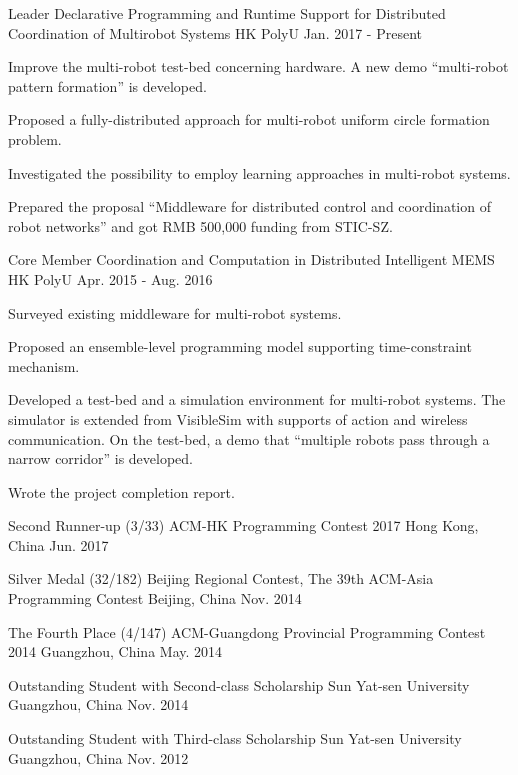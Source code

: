\documentclass[11pt, a4paper]{awesome-cv} %
\begin{document}
\begin{cventries}
\cventry
{Leader} %
{Declarative Programming and Runtime Support for Distributed Coordination of Multirobot Systems} %
{HK PolyU} %
{Jan. 2017 - Present} %
{ %
\begin{cvitems}
\item {Improve the multi-robot test-bed concerning hardware. A new demo ``multi-robot pattern formation'' is developed.}
\item {Proposed a fully-distributed approach for multi-robot uniform circle formation problem.}
\item {Investigated the possibility to employ learning approaches in multi-robot systems.}
\item {Prepared the proposal ``Middleware for distributed control and coordination of robot networks'' and got RMB 500,000 funding from STIC-SZ.}
\end{cvitems}
}

\cventry
{Core Member} %
{Coordination and Computation in Distributed Intelligent MEMS} %
{HK PolyU} %
{Apr. 2015 - Aug. 2016} %
{ %
\begin{cvitems}
\item {Surveyed existing middleware for multi-robot systems.}
\item {Proposed an ensemble-level programming model supporting time-constraint mechanism.}
\item {Developed a test-bed and a simulation environment for multi-robot systems. The simulator is extended from VisibleSim with supports of action and wireless communication. On the test-bed, a demo that ``multiple robots pass through a narrow corridor'' is developed.}
\item {Wrote the project completion report.}
\end{cvitems}
}
\end{cventries}

\begin{cvhonors}
\cvhonor
{Second Runner-up (3/33)} %
{ACM-HK Programming Contest 2017} %
{Hong Kong, China} %
{Jun. 2017} %

\cvhonor
{Silver Medal (32/182)} %
{Beijing Regional Contest, The 39th ACM-Asia Programming Contest} %
{Beijing, China} %
{Nov. 2014} %

\cvhonor
{The Fourth Place (4/147)} %
{ACM-Guangdong Provincial Programming Contest 2014} %
{Guangzhou, China} %
{May. 2014} %

\cvhonor
{Outstanding Student with Second-class Scholarship} %
{Sun Yat-sen University} %
{Guangzhou, China} %
{Nov. 2014} %

\cvhonor
{Outstanding Student with Third-class Scholarship} %
{Sun Yat-sen University} %
{Guangzhou, China} %
{Nov. 2012} %
\end{cvhonors}
\end{document}
